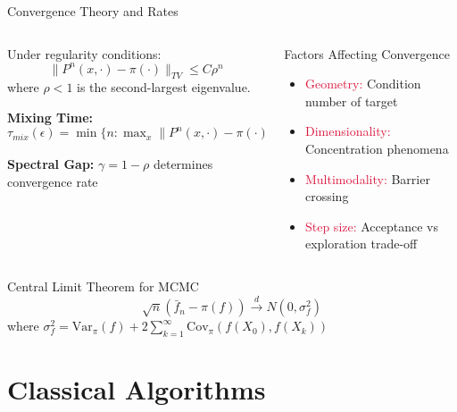 \documentclass[aspectratio=169,11pt]{beamer}
\newcommand{\Var}{\text{Var}}
\begin{document}
\begin{frame}{Convergence Theory and Rates}
\begin{columns}
\begin{column}{0.6\textwidth}
\begin{theorem}
Under regularity conditions:
\[\|P^n(x, \cdot) - \pi(\cdot)\|_{TV} \leq C \rho^n\]
where $\rho < 1$ is the second-largest eigenvalue.
\end{theorem}

\textbf{Mixing Time:} $\tau_{mix}(\epsilon) = \min\{n : \max_x \|P^n(x, \cdot) - \pi(\cdot)\|_{TV} \leq \epsilon\}$

\textbf{Spectral Gap:} $\gamma = 1 - \rho$ determines convergence rate
\end{column}
\begin{column}{0.4\textwidth}
\begin{block}{Factors Affecting Convergence}
\begin{itemize}
\item \textcolor{crimson}{Geometry:} Condition number of target
\item \textcolor{crimson}{Dimensionality:} Concentration phenomena
\item \textcolor{crimson}{Multimodality:} Barrier crossing
\item \textcolor{crimson}{Step size:} Acceptance vs exploration trade-off
\end{itemize}
\end{block}
\end{column}
\end{columns}

\vspace{0.3cm}
\begin{alertblock}{Central Limit Theorem for MCMC}
\[\sqrt{n}(\bar{f}_n - \pi(f)) \xrightarrow{d} N(0, \sigma^2_f)\]
where $\sigma^2_f = \Var_\pi(f) + 2\sum_{k=1}^\infty \text{Cov}_\pi(f(X_0), f(X_k))$
\end{alertblock}
\end{frame}

\section{Classical Algorithms}
\end{document}
